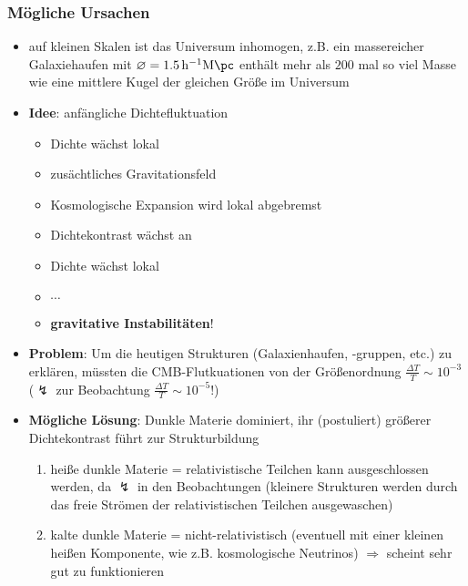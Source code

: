 \subsubsection{Mögliche Ursachen}
\begin{itemize}
	\item auf kleinen Skalen ist das Universum inhomogen, z.B. ein massereicher Galaxiehaufen mit $\varnothing=\SI{1.5}{h^{-1}M\pc}$ enthält mehr als $\num{200}$ mal so viel Masse wie eine mittlere Kugel der gleichen Größe im Universum
	\item \textbf{Idee}: anfängliche Dichtefluktuation
		\begin{itemize}
			\item Dichte wächst lokal
			\item zusächtliches Gravitationsfeld
			\item Kosmologische Expansion wird lokal abgebremst
			\item Dichtekontrast wächst an
			\item Dichte wächst lokal
			\item $\cdots$
			\item \textbf{gravitative Instabilitäten}!
		\end{itemize}
	\item \textbf{Problem}: Um die heutigen Strukturen (Galaxienhaufen, -gruppen, etc.) zu erklären, müssten die CMB-Flutkuationen von der Größenordnung $\frac{\Delta T}{T}\sim 10^{-3}$ ($\lightning$ zur Beobachtung $\frac{\Delta T}{T}\sim 10^{-5}$!)
	\item \textbf{Mögliche Lösung}: Dunkle Materie dominiert, ihr (postuliert) größerer Dichtekontrast führt zur Strukturbildung
		\begin{enumerate}[label={(\alph*)}]
			\item heiße dunkle Materie = relativistische Teilchen kann ausgeschlossen werden, da $\lightning$ in den Beobachtungen (kleinere Strukturen werden durch das freie Strömen der relativistischen Teilchen ausgewaschen)
			\item kalte dunkle Materie = nicht-relativistisch (eventuell mit einer kleinen heißen Komponente, wie z.B. kosmologische Neutrinos) $\Rightarrow$ scheint sehr gut zu funktionieren
		\end{enumerate}
\end{itemize}
